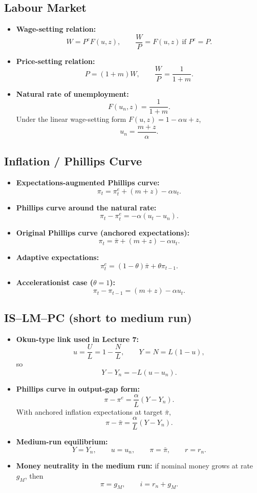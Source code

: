 \documentclass[12pt]{article}
\begin{document}
\subsection*{Labour Market}
\begin{itemize}[leftmargin=1.5em]
\item \textbf{Wage-setting relation:}
\[
W=P^eF(u,z), \qquad \frac{W}{P}=F(u,z)\ \text{if } P^e=P.
\]
\item \textbf{Price-setting relation:}
\[
P=(1+m)W, \qquad \frac{W}{P}=\frac{1}{1+m}.
\]
\item \textbf{Natural rate of unemployment:}
\[
F(u_n,z)=\frac{1}{1+m}.
\]
Under the linear wage-setting form $F(u,z)=1-\alpha u+z$,
\[
u_n=\frac{m+z}{\alpha}.
\]
\end{itemize}

\subsection*{Inflation / Phillips Curve}
\begin{itemize}[leftmargin=1.5em]
\item \textbf{Expectations-augmented Phillips curve:}
\[
\pi_t=\pi_t^e+(m+z)-\alpha u_t.
\]
\item \textbf{Phillips curve around the natural rate:}
\[
\pi_t-\pi_t^e=-\alpha(u_t-u_n).
\]
\item \textbf{Original Phillips curve (anchored expectations):}
\[
\pi_t=\bar{\pi}+(m+z)-\alpha u_t.
\]
\item \textbf{Adaptive expectations:}
\[
\pi_t^e=(1-\theta)\bar{\pi}+\theta\pi_{t-1}.
\]
\item \textbf{Accelerationist case ($\theta=1$):}
\[
\pi_t-\pi_{t-1}=(m+z)-\alpha u_t.
\]
\end{itemize}

\subsection*{IS--LM--PC (short to medium run)}
\begin{itemize}[leftmargin=1.5em]
\item \textbf{Okun-type link used in Lecture 7:}
\[
u=\frac{U}{L}=1-\frac{N}{L}, \qquad Y=N=L(1-u),
\]
so
\[
Y-Y_n=-L(u-u_n).
\]
\item \textbf{Phillips curve in output-gap form:}
\[
\pi-\pi^e=\frac{\alpha}{L}(Y-Y_n).
\]
With anchored inflation expectations at target $\bar{\pi}$,
\[
\pi-\bar{\pi}=\frac{\alpha}{L}(Y-Y_n).
\]
\item \textbf{Medium-run equilibrium:}
\[
Y=Y_n,\qquad u=u_n,\qquad \pi=\bar{\pi},\qquad r=r_n.
\]
\item \textbf{Money neutrality in the medium run:} if nominal money grows at rate $g_M$, then
\[
\pi=g_M,\qquad i=r_n+g_M.
\]
\end{itemize}
\end{document}
